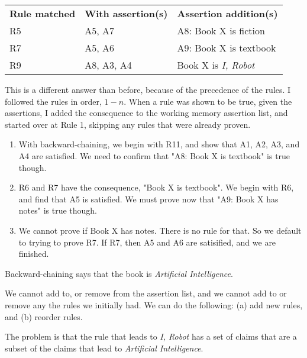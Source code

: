 \documentclass[11pt,largemargins, anonymous]{homework}
\begin{document}
\begin{arabicparts}

\questionpart

\begin{tabular}{lll}
    \textbf{Rule matched} & \textbf{With assertion(s)} & \textbf{Assertion addition(s)} \\
    R5 & A5, A7 & A8: Book X is fiction \\
    R7 & A5, A6 & A9: Book X is textbook \\
    R9 & A8, A3, A4 & Book X is \textit{I, Robot}
\end{tabular}

This is a different answer than before, because of the precedence of the rules.
I followed the rules in order, $1-n$.
When a rule was shown to be true, given the assertions,
I added the consequence to the working memory assertion list,
and started over at Rule 1, skipping any rules that were already proven.

\questionpart

\begin{enumerate}

    \item With backward-chaining, we begin with R11,
    and show that A1, A2, A3, and A4 are satisfied.
    We need to confirm that "A8: Book X is textbook" is true though.

    \item R6 and R7 have the consequence, "Book X is textbook".
    We begin with R6, and find that A5 is satisfied.
    We must prove now that "A9: Book X has notes" is true though.

    \item We cannot prove if Book X has notes. There is no rule for that.
    So we default to trying to prove R7.
    If R7, then A5 and A6 are satisified, and we are finished.

\end{enumerate}

Backward-chaining says that the book is \textit{Artificial Intelligence}.

\end{arabicparts}

\question

We cannot add to, or remove from the assertion list,
and we cannot add to or remove any the rules we initially had.
We can do the following:
(a) add new rules, and
(b) reorder rules.

The problem is that the rule that leads to \textit{I, Robot}
has a set of claims that are a subset of the claims that lead to \textit{Artificial Intelligence}.
\end{document}
